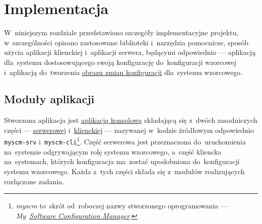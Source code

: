 \documentclass[thesis]{subfiles}
\begin{document}
\chapter{Implementacja}
\label{ch:implementacja}

W~niniejszym rozdziale przedstawiono szczegóły implementacyjne projektu, w~szczególności opisano zastosowane biblioteki i~narzędzia pomocnicze, sposób użycia aplikacji klienckiej i~aplikacji serwera, będącymi odpowiednio --- aplikacją dla~systemu dostosowującego swoją konfigurację do~konfiguracji wzorcowej i~aplikacją do~tworzenia \hyperref[sec:obraz-zmian-konfiguracji]{obrazu zmian konfiguracji} dla~systemu wzorcowego.


\section{Moduły aplikacji}

Stworzona aplikacja jest \href{https://en.wikipedia.org/wiki/Command-line_interface}{aplikacją konsolową} składającą się z~dwóch zasadniczych części --- \hyperref[sec:srv-app]{serwerowej} i~\hyperref[sec:cli-app]{klienckiej} --- nazywanej w~kodzie źródłowym odpowiednio \texttt{myscm-srv} i~\texttt{myscm-cli}\footnote{\emph{myscm} to~skrót od~roboczej nazwy stworzonego oprogramowania --- \emph{My~\href{https://en.wikipedia.org/wiki/Software_configuration_management}{Software Configuration Manager}}.}. Część serwerowa jest przeznaczona do~uruchomienia na~systemie odgrywającym rolę systemu wzorcowego, a~część kliencka na~systemach, których konfiguracja ma~zostać upodobniona do~konfiguracji systemu wzorcowego. Każda z~tych części składa się z~modułów realizujących rozłączone zadania.
\end{document}
